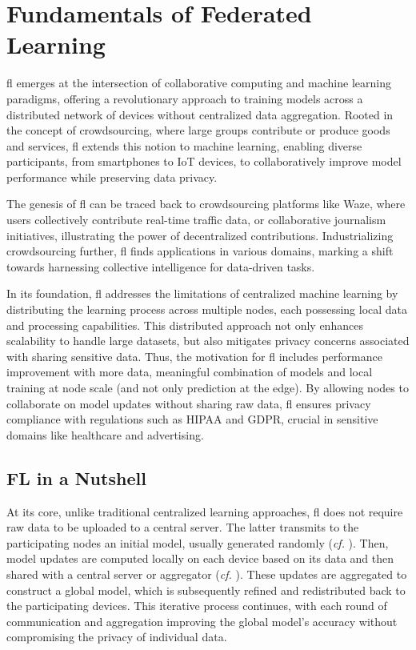 \documentclass[conference]{IEEEtran}
\begin{document}
\section{Fundamentals of Federated Learning\label{sec:fl}} %




\Gls{fl} emerges at the intersection of collaborative computing and machine learning paradigms, offering a revolutionary approach to training models across a distributed network of devices without centralized data aggregation.
Rooted in the concept of crowdsourcing, where large groups contribute or produce goods and services, \gls{fl} extends this notion to machine learning, enabling diverse participants, from smartphones to IoT devices, to collaboratively improve model performance while preserving data privacy.

The genesis of \gls{fl} can be traced back to crowdsourcing platforms like Waze, where users collectively contribute real-time traffic data, or collaborative journalism initiatives, illustrating the power of decentralized contributions. Industrializing crowdsourcing further, \gls{fl} finds applications in various domains, marking a shift towards harnessing collective intelligence for data-driven tasks.

In its foundation, \gls{fl} addresses the limitations of centralized machine learning by distributing the learning process across multiple nodes, each possessing local data and processing capabilities.
This distributed approach not only enhances scalability to handle large datasets, but also mitigates privacy concerns associated with sharing sensitive data.
Thus, the motivation for \gls{fl} includes performance improvement with more data, meaningful combination of models and local training at node scale (and not only prediction at the edge).
By allowing nodes to collaborate on model updates without sharing raw data, \gls{fl} ensures privacy compliance with regulations such as HIPAA and GDPR, crucial in sensitive domains like healthcare and advertising.


\subsection{FL in a Nutshell}

At its core, unlike traditional centralized learning approaches, \gls{fl} does not require raw data to be uploaded to a central server.
The latter transmits to the participating nodes an initial model, usually generated randomly (\emph{cf.} ).
Then, model updates are computed locally on each device based on its data and then shared with a central server or aggregator (\emph{cf.} ).
These updates are aggregated to construct a global model, which is subsequently refined and redistributed back to the participating devices.
This iterative process continues, with each round of communication and aggregation improving the global model's accuracy without compromising the privacy of individual data. 
\end{document}

